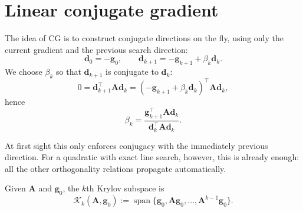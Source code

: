 \section{Linear conjugate gradient}
\label{sec:ch5-linear-cg}
The idea of CG is to construct conjugate directions on the fly, using only the
current gradient and the previous search direction:
\begin{equation}
  \label{eq:ch5-cg-recurrence}
  \mathbf{d}_0=-\mathbf{g}_0,
  \qquad
  \mathbf{d}_{k+1}=-\mathbf{g}_{k+1}+\beta_k \mathbf{d}_k.
\end{equation}
We choose $\beta_k$ so that $\mathbf{d}_{k+1}$ is conjugate to
$\mathbf{d}_k$:
\[
  0=\mathbf{d}_{k+1}^{\top}\mathbf{A}\mathbf{d}_k
  =(-\mathbf{g}_{k+1}+\beta_k \mathbf{d}_k)^{\top}\mathbf{A}\mathbf{d}_k,
\]
hence
\begin{equation}
  \label{eq:ch5-beta-a-form}
  \beta_k
  =\frac{\mathbf{g}_{k+1}^{\top}\mathbf{A}\mathbf{d}_k}
  {\mathbf{d}_k^{\top}\mathbf{A}\mathbf{d}_k}.
\end{equation}

At first sight this only enforces conjugacy with the immediately previous
direction. For a quadratic with exact line search, however, this is already
enough: all the other orthogonality relations propagate automatically.

\begin{definition}
\label{def:ch5-krylov}
Given $\mathbf{A}$ and $\mathbf{g}_0$, the $k$th Krylov subspace is
\[
  \mathcal{K}_k(\mathbf{A},\mathbf{g}_0)
  :=\operatorname{span}\{\mathbf{g}_0,\mathbf{A}\mathbf{g}_0,\ldots,
  \mathbf{A}^{k-1}\mathbf{g}_0\}.
\]
\end{definition}

